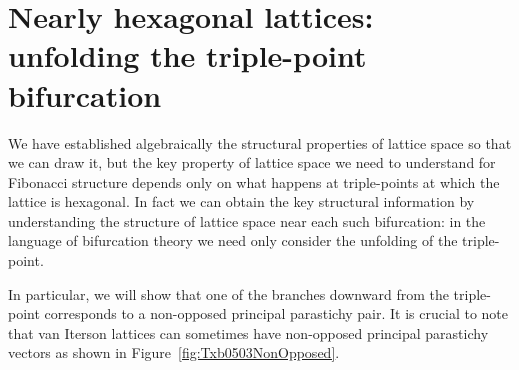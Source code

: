 \section[Unfolding the triple-point bifurcation]{Nearly hexagonal lattices: unfolding the triple-point bifurcation}
We have established algebraically the structural properties of lattice space so that we can draw it, but the key property of lattice space we need to understand for Fibonacci structure depends only on what happens at triple-points at which the lattice is hexagonal. In fact we can obtain the key structural information by understanding the structure of lattice space near each such bifurcation: in the language of bifurcation theory we need only consider the unfolding of the triple-point.  

In particular, we will show that one of the branches downward from the triple-point corresponds to a non-opposed principal parastichy pair. It is crucial to note that van Iterson lattices can sometimes have non-opposed principal parastichy vectors as shown in  Figure~\ref{fig:Txb0503NonOpposed}. 

%

